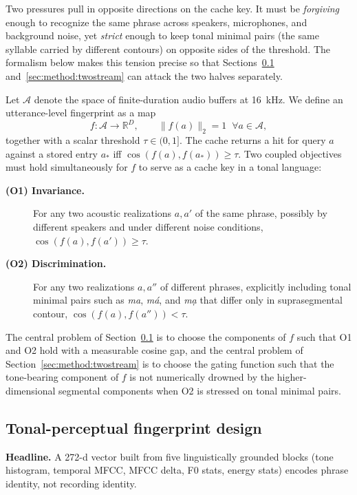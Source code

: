 \documentclass[a4paper,fleqn]{cas-dc}
\begin{document}
Two pressures pull in opposite directions on the cache key. It must be \emph{forgiving} enough to recognize the same phrase across speakers, microphones, and background noise, yet \emph{strict} enough to keep tonal minimal pairs (the same syllable carried by different contours) on opposite sides of the threshold. The formalism below makes this tension precise so that Sections~\ref{sec:method:fingerprint} and~\ref{sec:method:twostream} can attack the two halves separately.

Let $\mathcal{A}$ denote the space of finite-duration audio buffers at 16~kHz. We define an utterance-level fingerprint as a map
\begin{equation}
f : \mathcal{A} \longrightarrow \mathbb{R}^{D}, \qquad \lVert f(a) \rVert_{2} = 1 \;\; \forall a \in \mathcal{A},
\label{eq:fingerprint}
\end{equation}
together with a scalar threshold $\tau \in (0, 1]$. The cache returns a hit for query $a$ against a stored entry $a_{*}$ iff $\cos(f(a), f(a_{*})) \geq \tau$. Two coupled objectives must hold simultaneously for $f$ to serve as a cache key in a tonal language:
\begin{description}
\item[\textbf{(O1) Invariance.}] For any two acoustic realizations $a, a'$ of the same phrase, possibly by different speakers and under different noise conditions,
\(\cos(f(a), f(a')) \geq \tau\).
\item[\textbf{(O2) Discrimination.}] For any two realizations $a, a''$ of different phrases, explicitly including tonal minimal pairs such as \emph{ma}, \emph{m\'a}, and \emph{m\d{a}} that differ only in suprasegmental contour,
\(\cos(f(a), f(a'')) < \tau\).
\end{description}
The central problem of Section~\ref{sec:method:fingerprint} is to choose the components of $f$ such that O1 and O2 hold with a measurable cosine gap, and the central problem of Section~\ref{sec:method:twostream} is to choose the gating function such that the tone-bearing component of $f$ is not numerically drowned by the higher-dimensional segmental components when O2 is stressed on tonal minimal pairs.

\subsection{Tonal-perceptual fingerprint design}\label{sec:method:fingerprint}
\textbf{Headline.} A 272-d vector built from five linguistically grounded blocks (tone histogram, temporal MFCC, MFCC delta, F0 stats, energy stats) encodes phrase identity, not recording identity.
\end{document}
